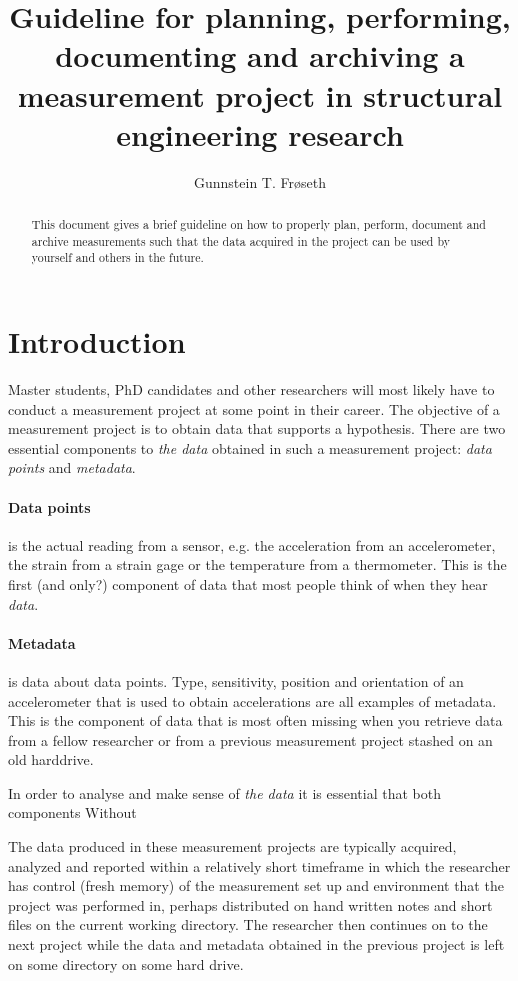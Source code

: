 \documentclass{article}
\title{Guideline for planning, performing, documenting and archiving a measurement project in structural engineering research}
\author{Gunnstein T. Frøseth}
\date{}
\begin{document}
\thispagestyle{empty}
\maketitle

\begin{abstract}
  This document gives a brief guideline on how to properly plan, perform, document and archive measurements such that the data acquired in the project can be used by yourself and others in the future.
\end{abstract}


\section{Introduction}
Master students, PhD candidates and other researchers will most likely
have to conduct a measurement project at some point in their career.  The objective of a measurement project is to obtain data that supports a hypothesis.  There are two essential components to \emph{the data} obtained in such a measurement project: \emph{data points} and \emph{metadata}.

\paragraph{Data points} is the actual reading from a sensor, e.g. the acceleration from an accelerometer, the strain from a strain gage or the temperature from a thermometer.  This is the first (and only?) component of data that most people think of when they hear \emph{data}.

\paragraph{Metadata} is data about data points.  Type, sensitivity, position and orientation of an accelerometer that is used to obtain accelerations are all examples of metadata.  This is the component of data that is most often missing when you retrieve data from a fellow researcher or from a previous measurement project stashed on an old harddrive.


In order to analyse and make sense of \emph{the data} it is essential that both components
Without

The data produced in these measurement projects are typically acquired, analyzed and reported within a relatively short timeframe  in which the researcher has control (fresh memory) of the measurement set up and environment that the project was performed in, perhaps distributed on hand written notes and short files on the current working directory.  The researcher then continues on to the next project while the data and metadata obtained in the previous project is left on some directory on some hard drive.
\end{document}
